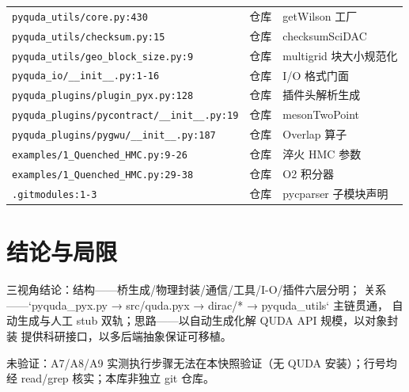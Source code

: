 \documentclass[UTF8]{ctexart}
\begin{document}
\begin{xltabular}{\textwidth}{lXX}
\texttt{\nolinkurl{pyquda_utils/core.py:430}} & 仓库 & getWilson 工厂 \\
\texttt{\nolinkurl{pyquda_utils/checksum.py:15}} & 仓库 & checksumSciDAC \\
\texttt{\nolinkurl{pyquda_utils/geo_block_size.py:9}} & 仓库 & multigrid 块大小规范化 \\
\texttt{\nolinkurl{pyquda_io/__init__.py:1-16}} & 仓库 & I/O 格式门面 \\
\texttt{\nolinkurl{pyquda_plugins/plugin_pyx.py:128}} & 仓库 & 插件头解析生成 \\
\texttt{\nolinkurl{pyquda_plugins/pycontract/__init__.py:19}} & 仓库 & mesonTwoPoint \\
\texttt{\nolinkurl{pyquda_plugins/pygwu/__init__.py:187}} & 仓库 & Overlap 算子 \\
\texttt{\nolinkurl{examples/1_Quenched_HMC.py:9-26}} & 仓库 & 淬火 HMC 参数 \\
\texttt{\nolinkurl{examples/1_Quenched_HMC.py:29-38}} & 仓库 & O2 积分器 \\
\texttt{\nolinkurl{.gitmodules:1-3}} & 仓库 & pycparser 子模块声明 \\
\bottomrule
\end{xltabular}

\section{结论与局限}
\begin{conclbox}
三视角结论：\textcolor{struct}{结构}——桥生成/物理封装/通信/工具/I-O/插件六层分明；
\textcolor{relation}{关系}——`pyquda\_pyx.py → src/quda.pyx → dirac/* → pyquda\_utils` 主链贯通，
自动生成与人工 stub 双轨；\textcolor{idea}{思路}——以自动生成化解 QUDA API 规模，以对象封装
提供科研接口，以多后端抽象保证可移植。
\end{conclbox}
\begin{warnbox}
\textcolor{warn}{未验证}：A7/A8/A9 实测执行步骤无法在本快照验证（无 QUDA 安装）；行号均经
read/grep 核实；本库非独立 git 仓库。
\end{warnbox}
\end{document}
